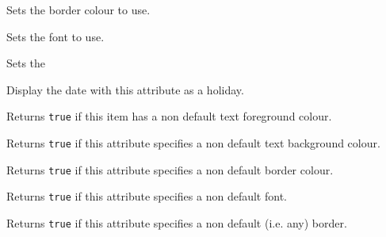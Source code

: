 
Sets the border colour to use.


\label{wxcalendardateattrsetfont}


Sets the font to use.


\label{wxcalendardateattrsetborder}


Sets the 


\label{wxcalendardateattrsetholiday}


Display the date with this attribute as a holiday.


\label{wxcalendardateattrhastextcolour}


Returns {\tt true} if this item has a non default text foreground colour.


\label{wxcalendardateattrhasbackgroundcolour}


Returns {\tt true} if this attribute specifies a non default text background colour.


\label{wxcalendardateattrhasbordercolour}


Returns {\tt true} if this attribute specifies a non default border colour.


\label{wxcalendardateattrhasfont}


Returns {\tt true} if this attribute specifies a non default font.


\label{wxcalendardateattrhasborder}


Returns {\tt true} if this attribute specifies a non default (i.e. any) border.


